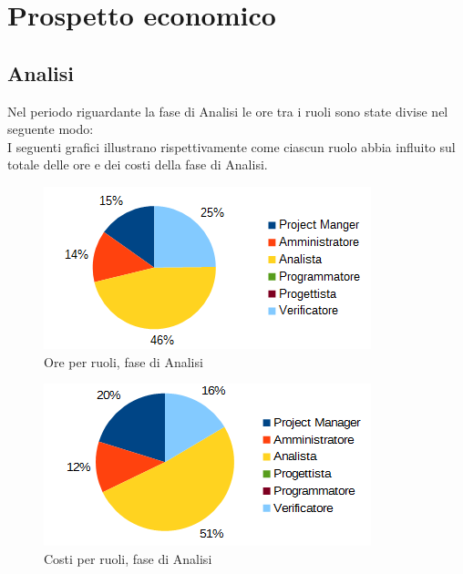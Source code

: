 \section{Prospetto economico}
	\subsection{Analisi}
	Nel periodo riguardante la fase di Analisi le ore tra i ruoli sono state divise nel seguente modo: \\
	I seguenti grafici illustrano rispettivamente come ciascun ruolo abbia influito sul totale
delle ore e dei costi della fase di Analisi.
	\begin{figure}[htbp]
		\centering
		\includegraphics[scale=1]{immagini/grafici/analisi-torta.png}
		\caption{Ore per ruoli, fase di Analisi}
	\end{figure}
	\begin{figure}[htbp]
		\centering
		\includegraphics[scale=1]{immagini/grafici/analisi-torta-costo.png}
		\caption{Costi per ruoli, fase di Analisi}
	\end{figure}
